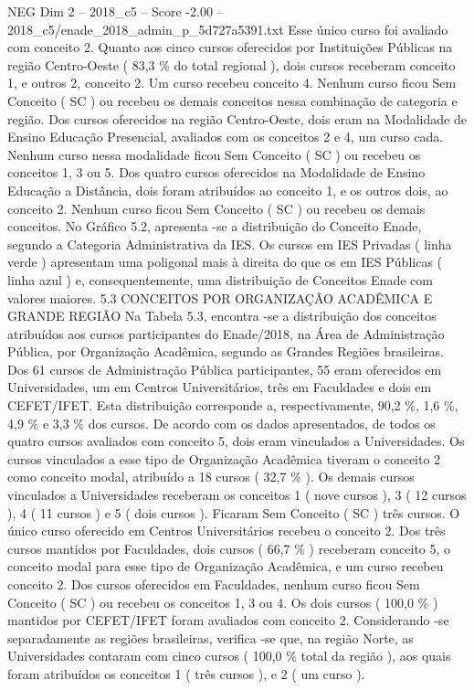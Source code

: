 \begin{textsample}{NEG Dim 2 – 2018\_c5 – Score -2.00 – 2018\_c5/enade\_2018\_admin\_p\_5d727a5391.txt}
Esse único curso foi avaliado com conceito 2.
Quanto aos cinco cursos oferecidos por Instituições Públicas na região Centro-Oeste ( 83,3 \% do total regional ), dois cursos receberam conceito 1, e outros 2, conceito 2.
Um curso recebeu conceito 4.
Nenhum curso ficou Sem Conceito ( SC ) ou recebeu os demais conceitos nessa combinação de categoria e região.
Dos cursos oferecidos na região Centro-Oeste, dois eram na Modalidade de Ensino Educação Presencial, avaliados com os conceitos 2 e 4, um curso cada.
Nenhum curso nessa modalidade ficou Sem Conceito ( SC ) ou recebeu os conceitos 1, 3 ou 5.
Dos quatro cursos oferecidos na Modalidade de Ensino Educação a Distância, dois foram atribuídos ao conceito 1, e os outros dois, ao conceito 2.
Nenhum curso ficou Sem Conceito ( SC ) ou recebeu os demais conceitos.
No Gráfico 5.2, apresenta -se a distribuição do Conceito Enade, segundo a Categoria Administrativa da IES.
Os cursos em IES Privadas ( linha verde ) apresentam uma poligonal mais à direita do que os em IES Públicas ( linha azul ) e, consequentemente, uma distribuição de Conceitos Enade com valores maiores. 5.3 CONCEITOS POR ORGANIZAÇÃO ACADÊMICA E GRANDE REGIÃO Na Tabela 5.3, encontra -se a distribuição dos conceitos atribuídos aos cursos participantes do Enade/2018, na Área de Administração Pública, por Organização Acadêmica, segundo as Grandes Regiões brasileiras.
Dos 61 cursos de Administração Pública participantes, 55 eram oferecidos em Universidades, um em Centros Universitários, três em Faculdades e dois em CEFET/IFET.
Esta distribuição corresponde a, respectivamente, 90,2 \%, 1,6 \%, 4,9 \% e 3,3 \% dos cursos.
De acordo com os dados apresentados, de todos os quatro cursos avaliados com conceito 5, dois eram vinculados a Universidades.
Os cursos vinculados a esse tipo de Organização Acadêmica tiveram o conceito 2 como conceito modal, atribuído a 18 cursos ( 32,7 \% ).
Os demais cursos vinculados a Universidades receberam os conceitos 1 ( nove cursos ), 3 ( 12 cursos ), 4 ( 11 cursos ) e 5 ( dois cursos ).
Ficaram Sem Conceito ( SC ) três cursos.
O único curso oferecido em Centros Universitários recebeu o conceito 2.
Dos três cursos mantidos por Faculdades, dois cursos ( 66,7 \% ) receberam conceito 5, o conceito modal para esse tipo de Organização Acadêmica, e um curso recebeu conceito 2.
Dos cursos oferecidos em Faculdades, nenhum curso ficou Sem Conceito ( SC ) ou recebeu os conceitos 1, 3 ou 4.
Os dois cursos ( 100,0 \% ) mantidos por CEFET/IFET foram avaliados com conceito 2.
Considerando -se separadamente as regiões brasileiras, verifica -se que, na região Norte, as Universidades contaram com cinco cursos ( 100,0 \% total da região ), aos quais foram atribuídos os conceitos 1 ( três cursos ), e 2 ( um curso ).

\end{textsample}
